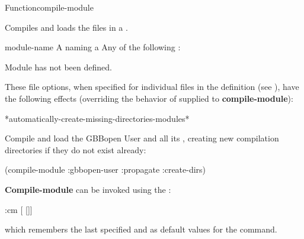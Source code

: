 \documentclass[10pt,twoside,english,pdftex]{article}
\begin{document}
\begin{functiondoc}{Function}{compile-module}{
     } 
%
% 
%
%
%

\fnsyntax 

\fnpurpose Compiles and loads the files in a .

\fnpackage {}

\fnmodule {}

\fnargs
\begin{args}{module-name}
 A  naming a 
\arg[option] Any of the following : 
\compilemoduleoptions
\end{args}

\fnerrors Module  has not been defined.\\
\relativedircircularity

\fndescription These file options, when specified for individual files in the
 definition (see \textbf{}), have the
following effects (overriding the behavior of  supplied to
\textbf{compile-module}): 
%
\W\supp\tabletop
\compilemodulefileoptions

\begin{alsos}{*automatically-create-missing-directories-modules*}
\end{alsos}

\fnexample Compile and load the GBBopen User  and all its
, creating new compilation directories if they do not
exist already:
%
\W\supp
\begin{example}
  (compile-module :gbbopen-user :propagate :create-dirs)
\end{example}

\fnnote \textbf{Compile-module} can be invoked using the :
%
%
%
\W\supp
\begin{example}
  :cm \textrm{[} \textrm{[}\superstar\textrm{]]}
\end{example}
%
which remembers the last specified  and  as
default values for the command.

\end{functiondoc}
\end{document}
